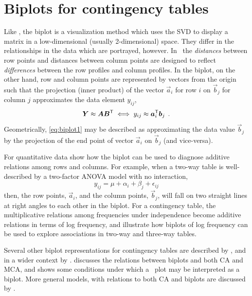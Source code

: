 \section{Biplots for contingency tables}\label{sec:biplot}
Like \CA, the biplot
\citep{BraduGabriel:78,Gabriel:71,Gabriel:80,Gabriel:81}
is a visualization method
which uses the SVD to display a matrix in a low-dimensional
(usually 2-dimensional) space.
They differ in the relationships in the data which are portrayed,
however.
In \CA\ the \emph{distances} between row points and
distances between column points are designed to reflect \emph{differences} between the row profiles
and column profiles.
In the biplot, on the other hand,
row and column points are represented by vectors from the origin
such that the projection 
(inner product) of the vector $\vec{a}_i$ for row $i$
on $\vec{b}_j$ for column $j$ approximates the data element
$y_{ij}$,
\begin{equation}\label{eq:biplot1}
 \bm{Y} \approx \bm{A} \bm{B}^\mathsf{T} \iff
 y_{ij} \approx \bm{a}_i ^\mathsf{T} \bm{b}_j
 \:\: .
\end{equation}
Geometrically, \eqref{eq:biplot1} may be described as approximating the data value
$\vec{b}_j$ by the projection of the end point of vector $\vec{a}_i$
on $\vec{b}_j$ (and vice-versa).

For quantitative data \citet{BraduGabriel:78} show how the biplot can be used
to diagnose additive relations among rows and columns. For example, when
a two-way table is well-described by a two-factor ANOVA model with no
interaction,
\begin{equation*}%
y_{ij} = \mu + \alpha_i + \beta_j + \epsilon_{ij}
\end{equation*}
then, the row points, $\vec{a}_i$, and the column points, $\vec{b}_j$,
will fall on two straight lines at right angles to each other in the
biplot.
For a contingency table, the multiplicative relations among
frequencies under independence become additive relations
in terms of log frequency,
and \citet{Gabriel-etal:97} illustrate how biplots of log frequency
can be used to explore associations in two-way and three-way tables.

Several other biplot representations for contingency tables
are described by \citet{Gabriel:95a,Gabriel:95b}, and in a wider
context by \citet{GowerHand:96}.
\citet{Greenacre:93} discusses the relations between biplots and
both CA and MCA, and shows some conditions under which a
\CA\ plot may be interpreted as a biplot.
More general models, with relations to both CA and biplots are
discussed by \citet{Goodman:86,Goodman:91}.

